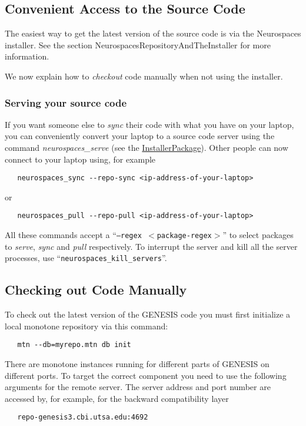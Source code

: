 \documentclass[12pt]{article}
\begin{document}
\subsection*{Convenient Access to the Source Code}

The easiest way to get the latest version of the source code is via the Neurospaces installer. See the section  NeurospacesRepositoryAndTheInstaller for more information.

We now explain how to {\it checkout} code manually when not using the installer.

\subsubsection*{Serving your source code}

If you want someone else to {\it sync} their code with what you have on your laptop, you can conveniently convert your laptop to a source code server using the command {\it neurospaces\_serve} (see the \href{../installerpackage/installerpackage.tex}{InstallerPackage}). Other people can now connect to your laptop using, for example
\begin{verbatim}
   neurospaces_sync --repo-sync <ip-address-of-your-laptop>
\end{verbatim}
or
\begin {verbatim}
   neurospaces_pull --repo-pull <ip-address-of-your-laptop>
\end{verbatim}
All these commands accept a ``{\tt --regex $<$package-regex$>$}'' to select packages to {\it serve}, {\it sync} and {\it pull} respectively. To interrupt the server and kill all the server processes, use ``{\tt neurospaces\_kill\_servers}''.

\subsection*{Checking out Code Manually}

To check out the latest version of the GENESIS code you must first initialize a local monotone repository via this command:
\begin{verbatim}
   mtn --db=myrepo.mtn db init 
\end{verbatim}
There are monotone instances running for different parts of GENESIS on different ports. To target the correct component you need to use the following arguments for the remote server. The server address and port number are accessed by, for example, for the backward compatibility layer
\begin{verbatim}
   repo-genesis3.cbi.utsa.edu:4692
\end{verbatim}
\end{document}

